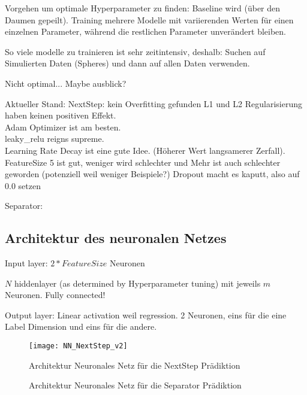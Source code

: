 Vorgehen um optimale Hyperparameter zu finden: 
Baseline wird (über den Daumen gepeilt).
Training mehrere Modelle mit variierenden Werten für einen einzelnen Parameter, 
während die restlichen Parameter unverändert bleiben.

So viele modelle zu trainieren ist sehr zeitintensiv, deshalb:
Suchen auf Simulierten Daten (Spheres) und dann auf allen Daten verwenden.

Nicht optimal... Maybe ausblick?


Aktueller Stand:
NextStep: kein Overfitting gefunden \textrightarrow L1 und L2 Regularisierung haben keinen positiven Effekt.\\
Adam Optimizer ist am besten.  \\
leaky\_relu reigns supreme. \\
Learning Rate Decay ist eine gute Idee. (Höherer Wert \textrightarrow langsamerer Zerfall). \\
FeatureSize 5 ist gut, weniger wird schlechter und Mehr ist auch schlechter geworden (potenziell weil weniger Beispiele?)
Dropout macht es kaputt, also auf 0.0 setzen

Separator: 

\subsection{Architektur des neuronalen Netzes}

Input layer: \(2 * FeatureSize\) Neuronen

\(N\) hiddenlayer (as determined by Hyperparameter tuning) mit jeweils \(m\) Neuronen.
Fully connected!

Output layer:
Linear activation weil regression.
2 Neuronen, eins für die eine Label Dimension und eins für die andere.

\begin{figure}
    \centering
	\texttt{[image: NN\_NextStep\_v2]}
	\caption{Architektur Neuronales Netz für die NextStep Prädiktion}
	\label{fig:netArchitectureNextStep}
\end{figure}

\begin{figure}
    \centering
	\caption{Architektur Neuronales Netz für die Separator Prädiktion}
	\label{fig:netArchitectureSep}
\end{figure}
